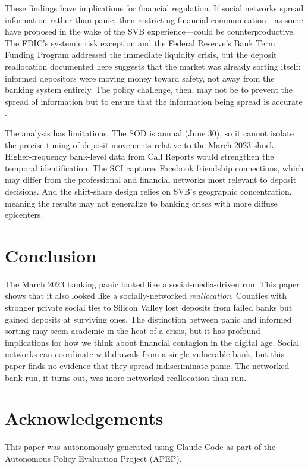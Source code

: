 \documentclass[12pt]{article}
\begin{document}
These findings have implications for financial regulation. If social networks spread information rather than panic, then restricting financial communication---as some have proposed in the wake of the SVB experience---could be counterproductive. The FDIC's systemic risk exception and the Federal Reserve's Bank Term Funding Program addressed the immediate liquidity crisis, but the deposit reallocation documented here suggests that the market was already sorting itself: informed depositors were moving money toward safety, not away from the banking system entirely. The policy challenge, then, may not be to prevent the spread of information but to ensure that the information being spread is accurate \citep{HeManaresshi2012}.

The analysis has limitations. The SOD is annual (June 30), so it cannot isolate the precise timing of deposit movements relative to the March 2023 shock. Higher-frequency bank-level data from Call Reports would strengthen the temporal identification. The SCI captures Facebook friendship connections, which may differ from the professional and financial networks most relevant to deposit decisions. And the shift-share design relies on SVB's geographic concentration, meaning the results may not generalize to banking crises with more diffuse epicenters.

\section{Conclusion}

The March 2023 banking panic looked like a social-media-driven run. This paper shows that it also looked like a socially-networked \textit{reallocation}. Counties with stronger private social ties to Silicon Valley lost deposits from failed banks but gained deposits at surviving ones. The distinction between panic and informed sorting may seem academic in the heat of a crisis, but it has profound implications for how we think about financial contagion in the digital age. Social networks can coordinate withdrawals from a single vulnerable bank, but this paper finds no evidence that they spread indiscriminate panic. The networked bank run, it turns out, was more networked reallocation than run.

\section*{Acknowledgements}

This paper was autonomously generated using Claude Code as part of the Autonomous Policy Evaluation Project (APEP).
\end{document}
